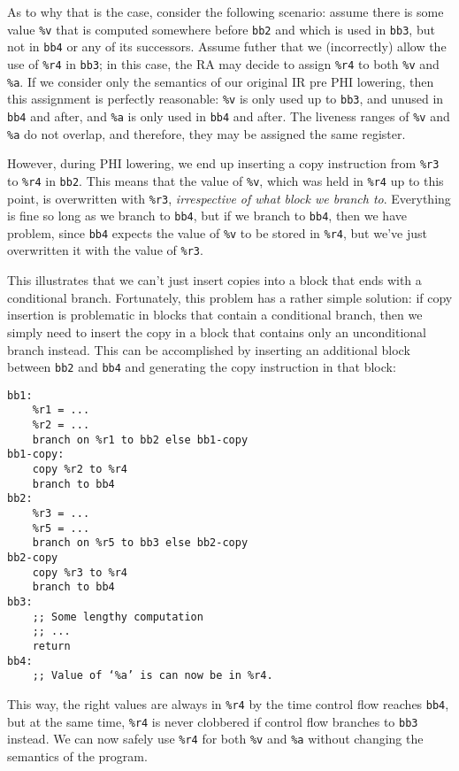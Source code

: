 \documentclass[12pt]{report}
\begin{document}
As to why that is the case, consider the following scenario: assume there is some value \verb|%v| that is computed somewhere before
\verb|bb2| and which is used in \verb|bb3|, but not in \verb|bb4| or any of its successors. Assume futher that we (incorrectly) allow
the use of \verb|%r4| in \verb|bb3|; in this case, the RA may decide to assign \verb|%r4| to both \verb|%v| and \verb|%a|. If we consider
only the semantics of our original IR pre PHI lowering, then this assignment is perfectly reasonable: \verb|%v| is only used up to
\verb|bb3|, and unused in \verb|bb4| and after, and \verb|%a| is only used in \verb|bb4| and after. The liveness ranges of \verb|%v| and
\verb|%a| do not overlap, and therefore, they may be assigned the same register.

However, during PHI lowering, we end up inserting a copy instruction from \verb|%r3| to \verb|%r4| in \verb|bb2|. This means that the value
of \verb|%v|, which was held in \verb|%r4| up to this point, is overwritten with \verb|%r3|, \textit{irrespective of what block we branch
to}. Everything is fine so long as we branch to \verb|bb4|, but if we branch to \verb|bb4|, then we have problem, since \verb|bb4|
expects the value of \verb|%v| to be stored in \verb|%r4|, but we've just overwritten it with the value of \verb|%r3|.

This illustrates that we can't just insert copies into a block that ends with a conditional branch. Fortunately, this problem has a rather
simple solution: if copy insertion is problematic in blocks that contain a conditional branch, then we simply need to insert the copy in a
block that contains only an unconditional branch instead. This can be accomplished by inserting an additional block between \verb|bb2| and
\verb|bb4| and generating the copy instruction in that block:
\begin{Verbatim}
bb1:
    %r1 = ...
    %r2 = ...
    branch on %r1 to bb2 else bb1-copy
bb1-copy:
    copy %r2 to %r4
    branch to bb4
bb2:
    %r3 = ...
    %r5 = ...
    branch on %r5 to bb3 else bb2-copy
bb2-copy
    copy %r3 to %r4
    branch to bb4
bb3:
    ;; Some lengthy computation
    ;; ...
    return
bb4:
    ;; Value of ‘%a’ is can now be in %r4.
\end{Verbatim}

\noindent This way, the right values are always in \verb|%r4| by the time control flow reaches \verb|bb4|, but at the same time, \verb|%r4|
is never clobbered if control flow branches to \verb|bb3| instead. We can now safely use \verb|%r4| for both \verb|%v| and \verb|%a| without
changing the semantics of the program.
\end{document}
